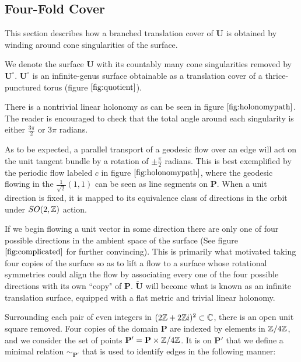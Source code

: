 \documentclass[]{article}
\def\bU{\mathbf{U}} \def\btU{\tilde{\bU}} \def\bUs{\bU^\circ}
\begin{document}
\subsection{Four-Fold Cover}
This section describes how a branched translation cover of $\bU$ is obtained by winding around cone singularities of the surface.

We denote the surface $\bU$ with its countably many cone singularities removed by $\bUs$. $\bUs$ is an infinite-genus surface obtainable as a translation cover of a thrice-punctured torus (figure $\ref{fig:quotient}$).

There is a nontrivial linear holonomy as can be seen in figure $\ref{fig:holonomypath}$. The reader is encouraged to check that the total angle around each singularity is either $\frac{3\pi}{2}$ or $3\pi$ radians.



As to be expected, a parallel transport of a geodesic flow over an edge will act on the unit tangent bundle by a rotation of $\pm\frac{\pi}{2}$ radians. This is best exemplified by the periodic flow labeled $c$ in figure $\ref{fig:holonomypath}$, where the geodesic flowing in the $\frac{1}{\sqrt{2}}(1,1)$ can be seen as line segments on $\mathbf{P}$. When a unit direction is fixed, it is mapped to its equivalence class of directions in the orbit under $SO(2,\mathbb{Z})$ action.



If we begin flowing a unit vector in some direction there are only one of four possible directions in the ambient space of the surface (See figure $\ref{fig:complicated}$ for further convincing). This is primarily what motivated taking four copies of the surface so as to lift a flow to a surface whose rotational symmetries could align the flow by associating every one of the four possible directions with its own ``copy" of $\mathbf{P}$. $\btU$ will become what is known as an infinite translation surface, equipped with a flat metric and trivial linear holonomy.



Surrounding each pair of even integers in $(2\mathbb{Z}+2\mathbb{Z} i)^2\subset \mathbb{C}$, there is an open unit square removed. Four copies of the domain $\mathbf{P}$ are indexed by elements in $\mathbb{Z}/4\mathbb{Z}$, and we consider the set of points $\mathbf{P}'=\mathbf{P}\times\mathbb{Z}/4\mathbb{Z}$.  It is on $\mathbf{P}'$ that we define a minimal relation $\sim_{\mathbf{P}'}$ that is used to identify edges in the following manner:
\end{document}
